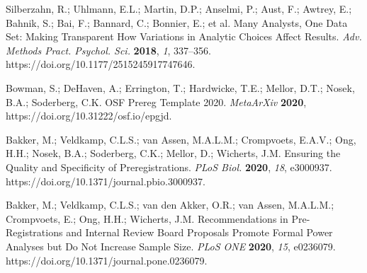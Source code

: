 \documentclass[psych,tutorial,accept,moreauthors,pdftex]{Definitions/mdpi}
\begin{document}
\begin{thebibliography}{999}
Silberzahn, R.; Uhlmann, E.L.; Martin, D.P.; Anselmi, P.; Aust, F.; Awtrey, E.; Bahnik, S.; Bai, F.; Bannard, C.; Bonnier, E.; et al. Many Analysts, One Data Set: Making Transparent How Variations in Analytic Choices Affect Results. \emph{Adv. Methods Pract. Psychol. Sci.} \textbf{2018}, \emph{1}, 337--356. https://doi.org/10.1177/2515245917747646.

Bowman, S.; DeHaven, A.; Errington, T.; Hardwicke, T.E.; Mellor, D.T.; Nosek, B.A.; Soderberg, C.K. OSF Prereg Template 2020. \emph{MetaArXiv} \textbf{2020}, https://doi.org/10.31222/osf.io/epgjd.


Bakker, M.; Veldkamp, C.L.S.; van Assen, M.A.L.M.; Crompvoets, E.A.V.; Ong, H.H.; Nosek, B.A.; Soderberg, C.K.; Mellor, D.; Wicherts, J.M. Ensuring the Quality and Specificity of Preregistrations. \emph{PLoS Biol.} \textbf{2020}, \emph{18}, e3000937. https://doi.org/10.1371/journal.pbio.3000937.


Bakker, M.; Veldkamp, C.L.S.; van den Akker, O.R.; van Assen, M.A.L.M.; Crompvoets, E.; Ong, H.H.; Wicherts, J.M. Recommendations in Pre-Registrations and Internal Review Board Proposals Promote Formal Power Analyses but Do Not Increase Sample Size. \emph{PLoS ONE} \textbf{2020}, \emph{15}, e0236079. https://doi.org/10.1371/journal.pone.0236079.



\end{thebibliography}
\end{document}
